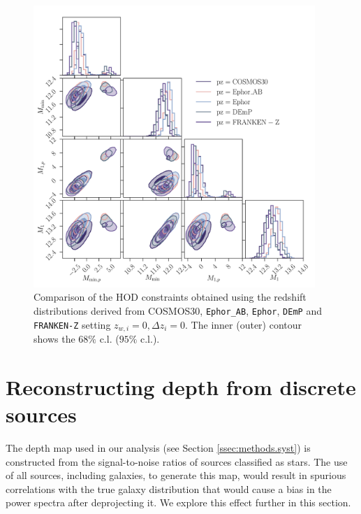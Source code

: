 \documentclass[a4paper,11pt]{article}
\begin{document}
\begin{figure}
  \begin{center}
    \includegraphics[width=0.95\textwidth]{figures/contours-Mmin-M1_mPk=HOD_fix=alpha-fc-sigmaM_HOD=zevol_no-pz-shifts_fit=auto+cross_cosmo=const_HOD-param=zfid_clfit=HOD-zevol_pz-methods.pdf}
    \caption{Comparison of the HOD constraints obtained using the redshift distributions derived from COSMOS30, \texttt{Ephor\_AB}, \texttt{Ephor}, \texttt{DEmP} and \texttt{FRANKEN-Z} setting $z_{w, i} = 0, \Delta z_{i} = 0$. The inner (outer) contour shows the $68 \%$ c.l. ($95 \%$ c.l.).}
    \label{fig:constraints-HOD-no-pz-shifts-pz-methods}
  \end{center}
\end{figure}



\appendix
\section{Reconstructing depth from discrete sources}\label{app:depth}
  The depth map used in our analysis (see Section \ref{ssec:methods.syst}) is constructed from the signal-to-noise ratios of sources classified as stars. The use of all sources, including galaxies, to generate this map, would result in spurious correlations with the true galaxy distribution that would cause a bias in the power spectra after deprojecting it. We explore this effect further in this section.
  
\end{document}
